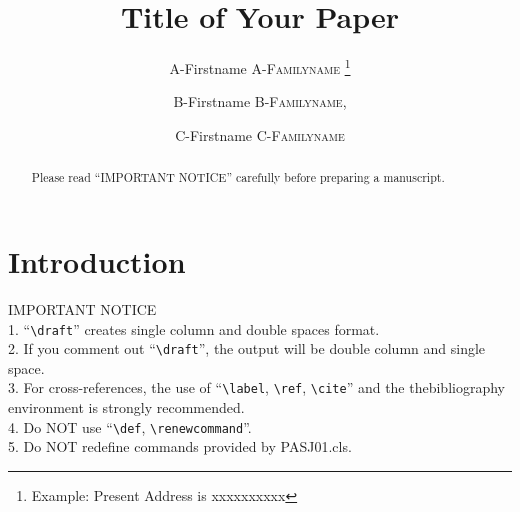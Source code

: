 \documentclass[]{pasj01}
\begin{document}
 
\Received{}%
\Accepted{}%

\title{Title of Your Paper}

\author{A-Firstname \textsc{A-Familyname}%
\thanks{Example: Present Address is xxxxxxxxxx}}

\author{B-Firstname \textsc{B-Familyname},}

\author{C-Firstname \textsc{C-Familyname}}


\maketitle

\begin{abstract}
Please read ``IMPORTANT NOTICE'' carefully before preparing a manuscript. 
\end{abstract}


\section{Introduction}

\noindent IMPORTANT NOTICE\\
1. ``\verb|\draft|'' creates single column and double spaces format.\\
2. If you comment out ``\verb|\draft|'', the output will be double column
   and single space.\\
3. For cross-references, the use of ``\verb|\label|, \verb|\ref|, \verb|\cite|'' 
   and the thebibliography environment is strongly recommended. \\
4. Do NOT use ``\verb|\def|, \verb|\renewcommand|''.\\
5. Do NOT redefine commands provided by PASJ01.cls.\\


\newpage
\end{document}
